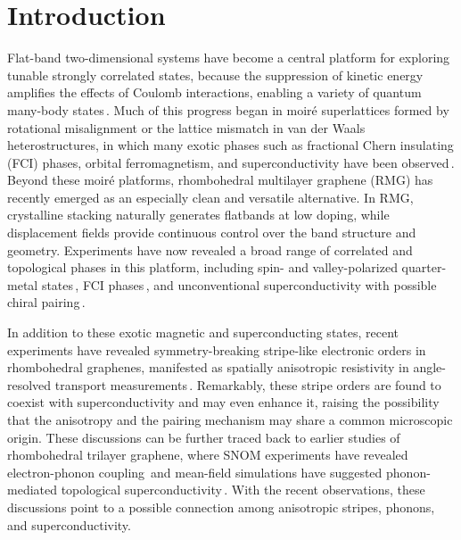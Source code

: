 \documentclass[aps,prx,article,twocolumn,amsmath,amssymb,superscriptaddress,longbibliography]{revtex4-2}
\begin{document}
\section{Introduction}

Flat-band two-dimensional systems have become a central platform for exploring tunable strongly correlated states, because the suppression of kinetic energy amplifies the effects of Coulomb interactions, enabling a variety of quantum many-body states\,\cite{bistritzer2011moire, nuckolls2024microscopic, andrei2021marvels}. Much of this progress began in moir\'e superlattices formed by rotational misalignment or the lattice mismatch in van der Waals heterostructures, in which many exotic phases such as fractional Chern insulating (FCI) phases, orbital ferromagnetism, and superconductivity have been observed\,\cite{cao2018unconventional,cao2018correlated,balents2020superconductivity, wang2020correlated,cai2023signatures, ju2024fractional,bernevig2025fractional}. Beyond these moiré platforms, rhombohedral multilayer graphene (RMG) has recently emerged as an especially clean and versatile alternative. In RMG, crystalline stacking naturally generates flatbands at low doping, while displacement fields provide continuous control over the band structure and geometry. Experiments have now revealed a broad range of correlated and topological phases in this platform, including spin- and valley-polarized quarter-metal states\,\cite{zhou2021half, han2023orbital, auerbach2025isospin, shi2020electronic, xie2026magnetic, aronson2025displacement}, FCI phases\,\cite{lu2024fractional, lu2025extended, xie2025tunable, zhang2026moire, xiao2025thickness}, and unconventional superconductivity with possible chiral pairing\,\cite{zhou2021superconductivity, han2025signatures, han2026evidence, choi2025superconductivity, holleis2025fluctuating}.

In addition to these exotic magnetic and superconducting states, recent experiments have revealed symmetry-breaking stripe-like electronic orders in rhombohedral graphenes, manifested as spatially anisotropic resistivity in angle-resolved transport measurements\,\cite{qin2025extreme,morissette2025superconductivity}. Remarkably, these stripe orders are found to coexist with superconductivity and may even enhance it, raising the possibility that the anisotropy and the pairing mechanism may share a common microscopic origin. These discussions can be further traced back to earlier studies of rhombohedral trilayer graphene, where SNOM experiments have revealed electron-phonon coupling\,\cite{zan2024electron} and mean-field simulations have suggested phonon-mediated topological superconductivity\,\cite{chou2021acoustic}. With the recent observations, these discussions point to a possible connection among anisotropic stripes, phonons, and superconductivity.
\end{document}
